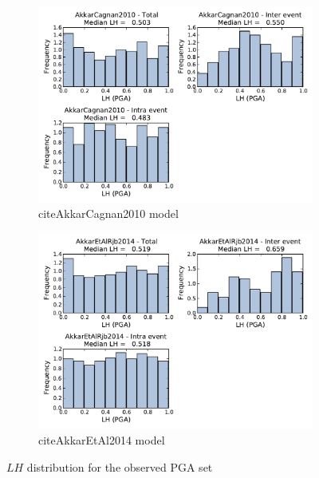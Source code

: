 \begin{figure}[htb]
\begin{subfigure}[b]{0.49\textwidth}
      \includegraphics[width=\textwidth]{./figures/residuals/AC2010_LH_PGA.pdf}
      \caption{citeAkkarCagnan2010 model}
      \label{fig:pga_lh_ac2010}
  \end{subfigure}
      \begin{subfigure}[b]{0.49\textwidth}
      \includegraphics[width=\textwidth]{./figures/residuals/Akkar2014_LH_PGA.pdf}
     \caption{citeAkkarEtAl2014 model}
      \label{fig:pga_lh_akkar2014}
  \end{subfigure}
  \caption{$LH$ distribution for the observed PGA set}
  \label{fig:pga_lh}
\end{figure}

